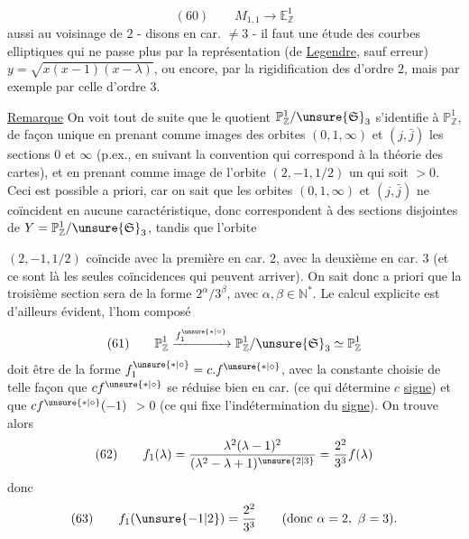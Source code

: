
\[
(60)\qquad
M_{1,1}\longrightarrow\mathbb E^1_{\mathbb Z}
\]
aussi au voisinage de $2$ - disons en car. $\ne 3$ - il faut une étude
des courbes elliptiques qui ne passe plus par la représentation
(de \uline{Legendre}, sauf erreur)
$y=\sqrt{x(x-1)(x-\lambda)}$, ou encore, par la rigidification des
 d'ordre $2$, mais par exemple par celle d'ordre $3$.

\uline{Remarque} On voit tout de suite que le quotient
$\mathbb P^1_{\mathbb Z}/\unsure{\mathfrak S}_3$ s'identifie à
$\mathbb P^1_{\mathbb Z}$, de façon unique en prenant comme images des
orbites $(0,1,\infty)$ et $(j,\bar j)$ les sections $0$ et $\infty$
(p.ex., en suivant la convention qui correspond à la théorie des cartes),
et en prenant comme image de l'orbite $(2,-1,1/2)$ un
 qui soit $>0$.
Ceci est possible a priori, car on sait que les 
orbites $(0,1,\infty)$ et $(j,\bar j)$
ne coïncident en aucune caractéristique, donc correspondent à des sections
disjointes de $Y=\mathbb P^1_{\mathbb Z}/\unsure{\mathfrak S}_3$,
tandis que l'orbite 


$(2,-1,1/2)$ coïncide avec la première en car. $2$, avec la deuxième en
car. $3$ (et ce sont là les seules coïncidences qui peuvent arriver).
On sait donc a priori que la troisième section sera de la forme
$2^\alpha/3^\beta$, avec $\alpha,\beta\in\mathbb N^*$.
Le calcul explicite est d'ailleurs évident, l'hom composé
\[
(61)\qquad
\mathbb P^1_{\mathbb Z}
\xrightarrow{f_1^{\unsure{*|\circ}}}
\mathbb P^1_{\mathbb Z}/\unsure{\mathfrak S}_3
\simeq\mathbb P^1_{\mathbb Z}
\]
doit être de la forme
$f_1^{\unsure{*|\circ}}=c.f^{\unsure{*|\circ}}$, avec la constante
 choisie de telle façon que
$cf^{\unsure{*|\circ}}$  se réduise bien en
 car. (ce qui détermine $c$  \uline{signe})
et que
$cf^{\unsure{*|\circ}}(-1)$  $>0$
(ce qui fixe l'indétermination du \uline{signe}).
On trouve alors
\[
(62)\qquad
f_1(\lambda)=
\frac{\lambda^2(\lambda-1)^2}{(\lambda^2-\lambda+1)^{\unsure{2|3}}}
=\frac{2^2}{3^3}f(\lambda)
\]
donc
\[
(63)\qquad
f_1(\unsure{-1|2})=\frac{2^2}{3^3}
\qquad(\text{donc }\alpha=2,\ \beta=3).
\]

